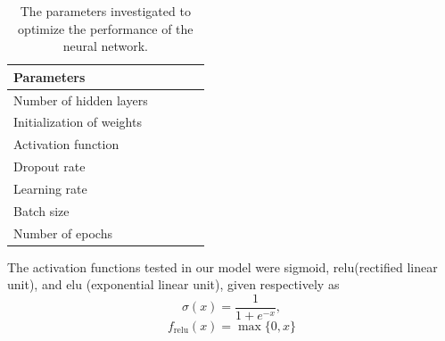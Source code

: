 \documentclass[prl,twocolumn]{revtex4-1}
\begin{document}
\begin{table}[!ht]
\begin{center}
\begin{tabular}{lllll}
\hline
Parameters\\
\hline
Number of hidden layers\\
Initialization of weights\\
Activation function\\
Dropout rate\\
Learning rate \\
Batch size \\
Number of epochs \\
\hline
\end{tabular}
\end{center}
\caption{The parameters investigated to optimize the performance of the neural network.}
\label{tab:parameters}
\end{table}




The activation functions tested in our model were sigmoid, relu(rectified linear unit), and elu (exponential linear unit), given respectively as
\begin{equation}
    \sigma(x) = \frac{1}{1+e^{-x}},
    \label{eq:sigmoid}
\end{equation}
\begin{equation}
    f_\textrm{relu}(x) = \max \{0,x\}
    \label{eq:relu}
\end{equation}
\end{document}
